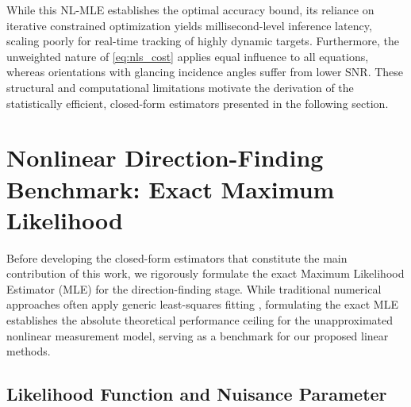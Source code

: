 \documentclass[journal]{IEEEtran}
\begin{document}
While this NL-MLE establishes the optimal accuracy bound, its reliance on iterative constrained optimization yields millisecond-level inference latency, scaling poorly for real-time tracking of highly dynamic targets. Furthermore, the unweighted nature of \eqref{eq:nls_cost} applies equal influence to all equations, whereas orientations with glancing incidence angles suffer from lower SNR. These structural and computational limitations motivate the derivation of the statistically efficient, closed-form estimators presented in the following section.







\section{Nonlinear Direction-Finding Benchmark: Exact Maximum Likelihood}
\label{sec:NoLineal}

Before developing the closed-form estimators that constitute the main contribution of this work, we rigorously formulate the exact Maximum Likelihood Estimator (MLE) for the direction-finding stage. While traditional numerical approaches often apply generic least-squares fitting \cite{Qin2020, Ma2024}, formulating the exact MLE establishes the absolute theoretical performance ceiling for the unapproximated nonlinear measurement model, serving as a benchmark for our proposed linear methods.

\subsection{Likelihood Function and Nuisance Parameter}
\end{document}
